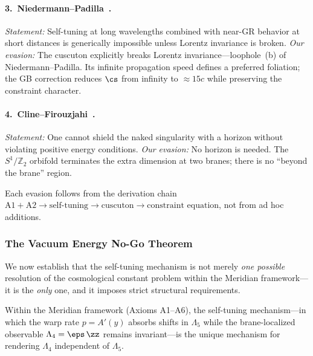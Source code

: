 \paragraph{3.\ Niedermann--Padilla~\cite{ch1:niedermann-padilla}.}
\emph{Statement:} Self-tuning at long wavelengths combined with near-GR behavior at short distances is generically impossible unless Lorentz invariance is broken. \emph{Our evasion:} The cuscuton explicitly breaks Lorentz invariance---loophole~(b) of Niedermann--Padilla. Its infinite propagation speed defines a preferred foliation; the GB correction reduces $\cs$ from infinity to $\approx 15c$ while preserving the constraint character.

\paragraph{4.\ Cline--Firouzjahi~\cite{ch1:cline-firouzjahi}.}
\emph{Statement:} One cannot shield the naked singularity with a horizon without violating positive energy conditions. \emph{Our evasion:} No horizon is needed. The $S^1/\mathbb{Z}_2$ orbifold terminates the extra dimension at two branes; there is no ``beyond the brane'' region.

\medskip

Each evasion follows from the derivation chain $\mathrm{A1} + \mathrm{A2} \to \text{self-tuning} \to \text{cuscuton} \to \text{constraint equation}$, not from ad hoc additions.

\subsubsection{The Vacuum Energy No-Go Theorem}
\label{sec:1-nogo-formal}

We now establish that the self-tuning mechanism is not merely \emph{one possible} resolution of the cosmological constant problem within the Meridian framework---it is the \emph{only} one, and it imposes strict structural requirements.

\begin{claim}
\label{thm:1-uniqueness}
Within the Meridian framework (Axioms A1--A6), the self-tuning mechanism---in which the warp rate $p = A'(y)$ absorbs shifts in $\Lambda_5$ while the brane-localized observable $\Lambda_4 = \eps\,\zz$ remains invariant---is the unique mechanism for rendering $\Lambda_4$ independent of $\Lambda_5$.
\end{claim}


